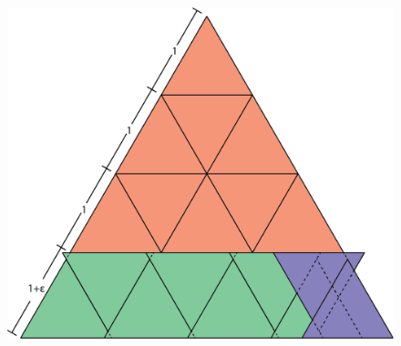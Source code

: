 \documentclass[a4paper]{amsart}
\theoremstyle{plain}
\theoremstyle{definition}
\begin{document}
\begin{figure}[h]
\centering
\includegraphics[width=0.5\linewidth]{triangle1.png}
\caption{}
\label{fig:triangle1}
\end{figure}

\end{document}
